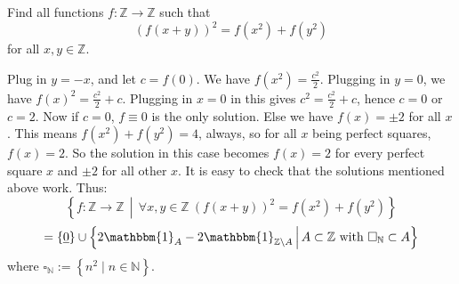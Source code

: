 \begin{problem}
    Find all functions \( f : \mathbb Z \to \mathbb Z \) such that
    \[
        \left(f\left(x + y\right)\right)^2 = f\left(x^2\right) + f\left(y^2\right)
    \]
    for all \( x, y \in \mathbb Z \).
\end{problem}
\begin{solution}
    Plug in \( y=-x \), and let \( c=f\left(0\right) \). We have \( f\left(x^2\right) = \frac{c^2}{2} \). Plugging in \( y=0 \), we have \( f\left(x\right)^2 = \frac{c^2}{2} + c \). Plugging in \( x=0 \) in this gives \( c^2=\frac{c^2}{2}+c \), hence \( c=0 \) or \( c=2 \). Now if \( c=0 \), \( f \equiv 0 \) is the only solution. Else we have \( f\left(x\right) = \pm 2 \) for all \( x \). This means \( f\left(x^2\right) + f\left(y^2\right) = 4 \), always, so for all \( x \) being perfect squares, \( f\left(x\right)=2 \). So the solution in this case becomes \( f\left(x\right) = 2 \) for every perfect square \( x \) and \( \pm 2 \) for all other \( x \). It is easy to check that the solutions mentioned above work. Thus:
    \[
        \left\{ f : \mathbb{Z} \to \mathbb{Z} \,\middle|\, \forall x,y \in \mathbb{Z} \ \left(f\left(x + y\right)\right)^2 = f\left(x^2\right) + f\left(y^2\right) \right\}
    \]
    \[
        = \left\{ \underline{0} \right\} \cup \left\{ 2\mathbbm{1}_{A} - 2\mathbbm{1}_{\mathbb{Z} \setminus A} \,\middle|\, A \subset \mathbb{Z} \text{ with } \square_{\mathbb{N}} \subset A \right\}
    \]
    where \( \square_{\mathbb{N}} := \left\{ n^2 \mid n \in \mathbb{N} \right\} \).
\end{solution}
